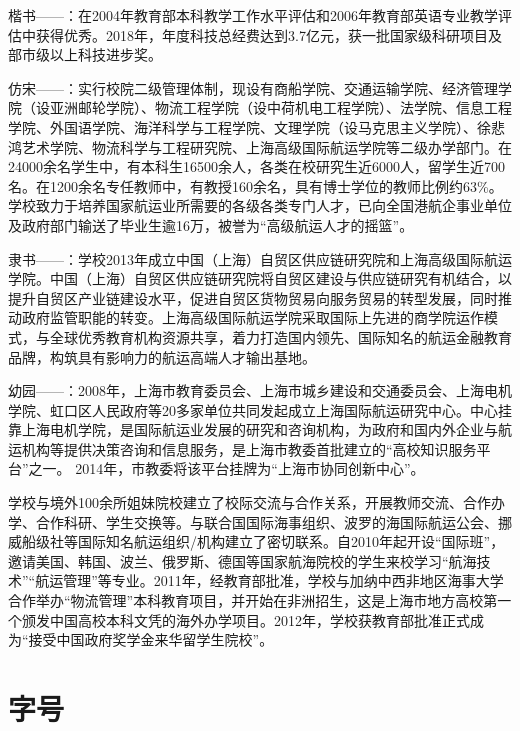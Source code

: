 {楷书——\cs{\kaishu}：\kaishu 在2004年教育部本科教学工作水平评估和2006年教育部英语专业教学评估中获得优秀。2018年，年度科技总经费达到3.7亿元，获一批国家级科研项目及部市级以上科技进步奖。}

{仿宋——：\fangsong 实行校院二级管理体制，现设有商船学院、交通运输学院、经济管理学院（设亚洲邮轮学院）、物流工程学院（设中荷机电工程学院）、法学院、信息工程学院、外国语学院、海洋科学与工程学院、文理学院（设马克思主义学院）、徐悲鸿艺术学院、物流科学与工程研究院、上海高级国际航运学院等二级办学部门。在24000余名学生中，有本科生16500余人，各类在校研究生近6000人，留学生近700名。在1200余名专任教师中，有教授160余名，具有博士学位的教师比例约63\%。学校致力于培养国家航运业所需要的各级各类专门人才，已向全国港航企事业单位及政府部门输送了毕业生逾16万，被誉为“高级航运人才的摇篮”。}

{隶书——：\lishu 学校2013年成立中国（上海）自贸区供应链研究院和上海高级国际航运学院。中国（上海）自贸区供应链研究院将自贸区建设与供应链研究有机结合，以提升自贸区产业链建设水平，促进自贸区货物贸易向服务贸易的转型发展，同时推动政府监管职能的转变。上海高级国际航运学院采取国际上先进的商学院运作模式，与全球优秀教育机构资源共享，着力打造国内领先、国际知名的航运金融教育品牌，构筑具有影响力的航运高端人才输出基地。}

{幼园——：\youyuan 2008年，上海市教育委员会、上海市城乡建设和交通委员会、上海电机学院、虹口区人民政府等20多家单位共同发起成立上海国际航运研究中心。中心挂靠上海电机学院，是国际航运业发展的研究和咨询机构，为政府和国内外企业与航运机构等提供决策咨询和信息服务，是上海市教委首批建立的“高校知识服务平台”之一。 2014年，市教委将该平台挂牌为“上海市协同创新中心”。

学校与境外100余所姐妹院校建立了校际交流与合作关系，开展教师交流、合作办学、合作科研、学生交换等。与联合国国际海事组织、波罗的海国际航运公会、挪威船级社等国际知名航运组织/机构建立了密切联系。自2010年起开设“国际班”，邀请美国、韩国、波兰、俄罗斯、德国等国家航海院校的学生来校学习“航海技术”“航运管理”等专业。2011年，经教育部批准，学校与加纳中西非地区海事大学合作举办“物流管理”本科教育项目，并开始在非洲招生，这是上海市地方高校第一个颁发中国高校本科文凭的海外办学项目。2012年，学校获教育部批准正式成为“接受中国政府奖学金来华留学生院校”。}

\section{字号}

